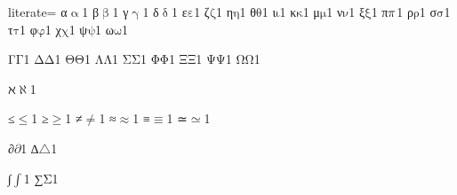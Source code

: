 {%

literate=
{α}{{\ensuremath{\mathrm{\upalpha}}}}1
{β}{{\ensuremath{\mathrm{\upbeta}}}}1
{γ}{{\ensuremath{\mathrm{\upgamma}}}}1
{δ}{{\ensuremath{\mathrm{\updelta}}}}1
{ε}{{\ensuremath{\mathrm{\varepsilon}}}}1
{ζ}{{\ensuremath{\mathrm{\zeta}}}}1
{η}{{\ensuremath{\mathrm{\eta}}}}1
{θ}{{\ensuremath{\mathrm{\theta}}}}1
{ι}{{\ensuremath{\mathrm{\iota}}}}1
{κ}{{\ensuremath{\mathrm{\kappa}}}}1
{μ}{{\ensuremath{\mathrm{\mu}}}}1
{ν}{{\ensuremath{\mathrm{\nu}}}}1
{ξ}{{\ensuremath{\mathrm{\xi}}}}1
{π}{{\ensuremath{\mathrm{\mathnormal{\pi}}}}}1
{ρ}{{\ensuremath{\mathrm{\rho}}}}1
{σ}{{\ensuremath{\mathrm{\sigma}}}}1
{τ}{{\ensuremath{\mathrm{\tau}}}}1
{φ}{{\ensuremath{\mathrm{\varphi}}}}1
{χ}{{\ensuremath{\mathrm{\chi}}}}1
{ψ}{{\ensuremath{\mathrm{\psi}}}}1
{ω}{{\ensuremath{\mathrm{\omega}}}}1

{Γ}{{\ensuremath{\mathrm{\Gamma}}}}1
{Δ}{{\ensuremath{\mathrm{\Delta}}}}1
{Θ}{{\ensuremath{\mathrm{\Theta}}}}1
{Λ}{{\ensuremath{\mathrm{\Lambda}}}}1
{Σ}{{\ensuremath{\mathrm{\Sigma}}}}1
{Φ}{{\ensuremath{\mathrm{\Phi}}}}1
{Ξ}{{\ensuremath{\mathrm{\Xi}}}}1
{Ψ}{{\ensuremath{\mathrm{\Psi}}}}1
{Ω}{{\ensuremath{\mathrm{\Omega}}}}1

{ℵ}{{\ensuremath{\aleph}}}1

{≤}{{\color{symbolcolor}\ensuremath{\leq}}}1
{≥}{{\color{symbolcolor}\ensuremath{\geq}}}1
{≠}{{\color{symbolcolor}\ensuremath{\neq}}}1
{≈}{{\color{symbolcolor}\ensuremath{\approx}}}1
{≡}{{\color{symbolcolor}\ensuremath{\equiv}}}1
{≃}{{\color{symbolcolor}\ensuremath{\simeq}}}1

{∂}{{\color{symbolcolor}\ensuremath{\partial}}}1
{∆}{{\color{symbolcolor}\ensuremath{\triangle}}}1 %

{∫}{{\color{symbolcolor}\ensuremath{\int}}}1
{∑}{{\color{symbolcolor}\ensuremath{\mathrm{\Sigma}}}}1

}
